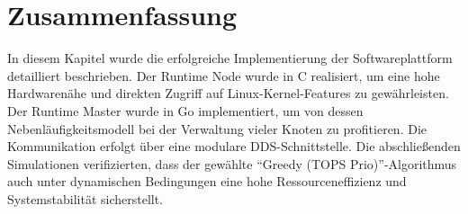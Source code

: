 \section{Zusammenfassung}

In diesem Kapitel wurde die erfolgreiche Implementierung der Softwareplattform detailliert beschrieben. Der Runtime Node wurde in C realisiert, um eine hohe Hardwarenähe und direkten Zugriff auf Linux-Kernel-Features zu gewährleisten. Der Runtime Master wurde in Go implementiert, um von dessen Nebenläufigkeitsmodell bei der Verwaltung vieler Knoten zu profitieren. Die Kommunikation erfolgt über eine modulare \gls{DDS}-Schnittstelle. Die abschließenden Simulationen verifizierten, dass der gewählte \enquote{Greedy (TOPS Prio)}-Algorithmus auch unter dynamischen Bedingungen eine hohe Ressourceneffizienz und Systemstabilität sicherstellt.